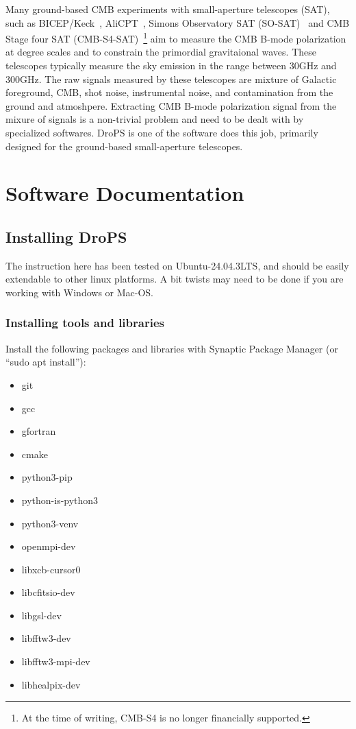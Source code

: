 \documentclass[12pt, a4paper]{ctexart} %
\begin{document}
Many ground-based CMB experiments with small-aperture telescopes (SAT), such as BICEP/Keck~\cite{BICEP}, AliCPT~\cite{AliCPT, Zhang24, AliCPT25}, Simons Observatory SAT (SO-SAT)~\cite{SO-SAT, SO-SAT-improve} and CMB Stage four SAT (CMB-S4-SAT)~\cite{CMB-S4-Intro, CMB-S4-SAT}\footnote{At the time of writing, CMB-S4 is no longer financially supported.} aim to measure the CMB B-mode polarization at degree scales and to constrain the primordial gravitaional waves. These telescopes typically measure the sky emission in the range between $30\mathrm{GHz}$ and $300\mathrm{GHz}$. The raw signals measured by these telescopes are mixture of Galactic foreground, CMB, shot noise, instrumental noise, and contamination from the ground and atmoshpere. Extracting CMB B-mode polarization signal from the mixure of signals is a non-trivial problem and need to be dealt with by specialized softwares. DroPS is one of the software does this job, primarily designed for the ground-based small-aperture telescopes.

\section{Software Documentation}


\subsection{Installing DroPS}

The instruction here has been tested on Ubuntu-24.04.3LTS, and should be easily extendable to other linux platforms. A bit twists may need to be done if you are working with Windows or Mac-OS.

\subsubsection{Installing tools and libraries}

Install the following packages and libraries with Synaptic Package Manager (or ``sudo apt install''):

\begin{itemize}
  \item{git}
  \item{gcc}
  \item{gfortran}
  \item{cmake}
  \item{python3-pip}
  \item{python-is-python3}
  \item{python3-venv}
  \item{openmpi-dev}
  \item{libxcb-cursor0}
  \item{libcfitsio-dev}
  \item{libgsl-dev}
  \item{libfftw3-dev}
  \item{libfftw3-mpi-dev}
  \item{libhealpix-dev}
\end{itemize}
\end{document}

